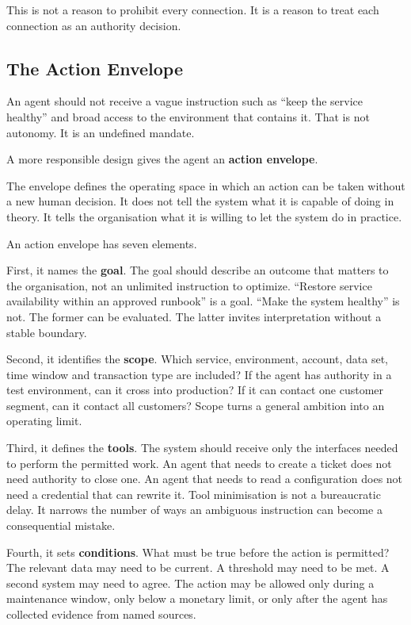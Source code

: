This is not a reason to prohibit every connection. It is a reason to
treat each connection as an authority decision.

\subsection{The Action Envelope}\label{the-action-envelope}

An agent should not receive a vague instruction such as ``keep the
service healthy'' and broad access to the environment that contains it.
That is not autonomy. It is an undefined mandate.

A more responsible design gives the agent an \textbf{action envelope}.

The envelope defines the operating space in which an action can be taken
without a new human decision. It does not tell the system what it is
capable of doing in theory. It tells the organisation what it is willing
to let the system do in practice.

An action envelope has seven elements.

First, it names the \textbf{goal}. The goal should describe an outcome
that matters to the organisation, not an unlimited instruction to
optimize. ``Restore service availability within an approved runbook'' is
a goal. ``Make the system healthy'' is not. The former can be evaluated.
The latter invites interpretation without a stable boundary.

Second, it identifies the \textbf{scope}. Which service, environment,
account, data set, time window and transaction type are included? If the
agent has authority in a test environment, can it cross into production?
If it can contact one customer segment, can it contact all customers?
Scope turns a general ambition into an operating limit.

Third, it defines the \textbf{tools}. The system should receive only the
interfaces needed to perform the permitted work. An agent that needs to
create a ticket does not need authority to close one. An agent that
needs to read a configuration does not need a credential that can
rewrite it. Tool minimisation is not a bureaucratic delay. It narrows
the number of ways an ambiguous instruction can become a consequential
mistake.

Fourth, it sets \textbf{conditions}. What must be true before the action
is permitted? The relevant data may need to be current. A threshold may
need to be met. A second system may need to agree. The action may be
allowed only during a maintenance window, only below a monetary limit,
or only after the agent has collected evidence from named sources.

